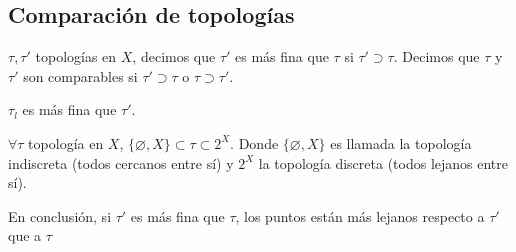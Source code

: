 \subsection{Comparación de topologías}

\begin{definition}
	$\tau,\tau'$ topologías en $X$, decimos que $\tau'$ es más fina que $\tau$ si $\tau' \supset \tau$. Decimos que $\tau$ y $\tau'$ son comparables si $\tau' \supset \tau$ o $\tau \supset \tau'$. 
\end{definition}

\begin{eg}
	$\tau_l$ es más fina que $\tau'$.
\end{eg}

\begin{eg}
	$\forall \tau$ topología en $X$, $\{ \varnothing, X \} \subset \tau \subset 2^X$. Donde $\{ \varnothing, X \}$ es llamada la topología indiscreta (todos cercanos entre sí) y $2^X$ la topología discreta (todos lejanos entre sí).    
\end{eg}

En conclusión, si $\tau'$ es más fina que $\tau$, los puntos están más lejanos respecto a $\tau'$ que a $\tau$

